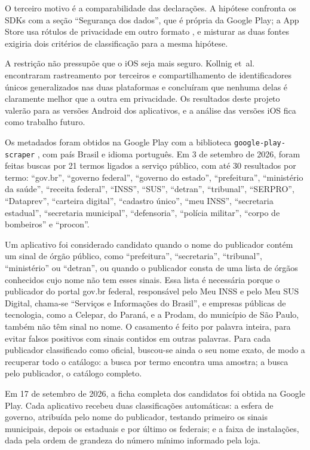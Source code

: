 O terceiro motivo é a comparabilidade das declarações. A hipótese confronta os SDKs com a seção ``Segurança dos dados'', que é própria da Google Play; a App Store usa rótulos de privacidade em outro formato \cite{xiao2023}, e misturar as duas fontes exigiria dois critérios de classificação para a mesma hipótese.

A restrição não pressupõe que o iOS seja mais seguro. Kollnig et~al.~\cite{kollnig2022ios} encontraram rastreamento por terceiros e compartilhamento de identificadores únicos generalizados nas duas plataformas e concluíram que nenhuma delas é claramente melhor que a outra em privacidade. Os resultados deste projeto valerão para as versões Android dos aplicativos, e a análise das versões iOS fica como trabalho futuro.

\label{sec:selecao}

Os metadados foram obtidos na Google Play com a biblioteca \texttt{google-\allowbreak{}play-\allowbreak{}scraper} \cite{jomingyu2024}, com país Brasil e idioma português. Em 3 de setembro de 2026, foram feitas buscas por 21 termos ligados a serviço público, com até 30 resultados por termo: ``gov.br'', ``governo federal'', ``governo do estado'', ``prefeitura'', ``ministério da saúde'', ``receita federal'', ``INSS'', ``SUS'', ``detran'', ``tribunal'', ``SERPRO'', ``Dataprev'', ``carteira digital'', ``cadastro único'', ``meu INSS'', ``secretaria estadual'', ``secretaria municipal'', ``defensoria'', ``polícia militar'', ``corpo de bombeiros'' e ``procon''.

Um aplicativo foi considerado candidato quando o nome do publicador contém um sinal de órgão público, como ``prefeitura'', ``secretaria'', ``tribunal'', ``ministério'' ou ``detran'', ou quando o publicador consta de uma lista de órgãos conhecidos cujo nome não tem esses sinais. Essa lista é necessária porque o publicador do portal gov.br federal, responsável pelo Meu INSS e pelo Meu SUS Digital, chama-se ``Serviços e Informações do Brasil'', e empresas públicas de tecnologia, como a Celepar, do Paraná, e a Prodam, do município de São Paulo, também não têm sinal no nome. O casamento é feito por palavra inteira, para evitar falsos positivos com sinais contidos em outras palavras. Para cada publicador classificado como oficial, buscou-se ainda o seu nome exato, de modo a recuperar todo o catálogo: a busca por termo encontra uma amostra; a busca pelo publicador, o catálogo completo.

Em 17 de setembro de 2026, a ficha completa dos candidatos foi obtida na Google Play. Cada aplicativo recebeu duas classificações automáticas: a esfera de governo, atribuída pelo nome do publicador, testando primeiro os sinais municipais, depois os estaduais e por último os federais; e a faixa de instalações, dada pela ordem de grandeza do número mínimo informado pela loja.

